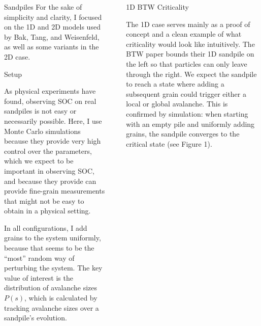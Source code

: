 \documentclass[final]{beamer}
\newlength{\sepwid}
\newlength{\onecolwid}
\begin{document}
\begin{frame}[t]
\begin{columns}[t]
\begin{column}{\onecolwid}
\begin{block}{Sandpiles}
For the sake of simplicity and clarity, I focused on the 1D and 2D models used by Bak, Tang, and Weisenfeld, as well as some variants in the 2D case.

\end{block}


\begin{block}{Setup}

As physical experiments have found, observing SOC on real sandpiles is not easy or necessarily possible. Here, I use Monte Carlo simulations because they provide very high control over the parameters, which we expect to be important in observing SOC, and because they provide can provide fine-grain measurements that might not be easy to obtain in a physical setting.

In all configurations, I add grains to the system uniformly, because that seems to be the ``most'' random way of perturbing the system. The key value of interest is the distribution of avalanche sizes $P(s)$, which is calculated by tracking avalanche sizes over a sandpile's evolution. 


\end{block}


\end{column} %

\begin{column}{\sepwid}\end{column} %



\begin{column}{\onecolwid} %

\begin{block}{1D BTW Criticality}

The 1D case serves mainly as a proof of concept and a clean example of what criticality would look like intuitively. The BTW paper bounds their 1D sandpile on the left so that particles can only leave through the right. We expect the sandpile to reach a state where adding a subsequent grain could trigger either a local or global avalanche. This is confirmed by simulation: when starting with an empty pile and uniformly adding grains, the sandpile converges to the critical state (see Figure 1).


\end{block}
\end{column}
\end{columns}
\end{frame}
\end{document}
